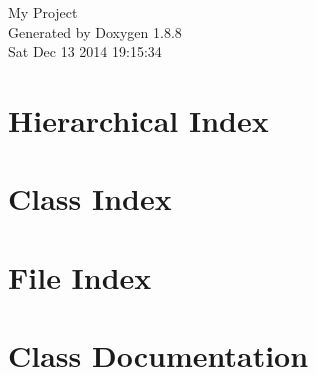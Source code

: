 \documentclass[twoside]{book}
\newcommand{\+}{\discretionary{\mbox{\scriptsize$\hookleftarrow$}}{}{}}
\newcommand{\clearemptydoublepage}{%
  \newpage{\pagestyle{empty}\cleardoublepage}%
}
\begin{document}
\hypersetup{pageanchor=false,
             bookmarks=true,
             bookmarksnumbered=true,
             pdfencoding=unicode
            }
\begin{titlepage}
\vspace*{7cm}
\begin{center}%
{\Large My Project }\\
\vspace*{1cm}
{\large Generated by Doxygen 1.8.8}\\
\vspace*{0.5cm}
{\small Sat Dec 13 2014 19:15:34}\\
\end{center}
\end{titlepage}
\clearemptydoublepage
\tableofcontents
\clearemptydoublepage
{}
\hypersetup{pageanchor=true}

\chapter{Hierarchical Index}

\chapter{Class Index}

\chapter{File Index}

\chapter{Class Documentation}































\end{document}
